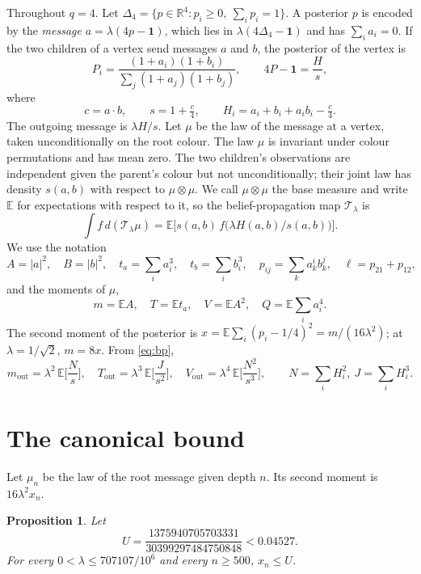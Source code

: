 \documentclass[11pt]{amsart}
\newtheorem{proposition}[theorem]{Proposition}
\theoremstyle{definition}
\theoremstyle{remark}
\newcommand{\E}{\mathbb{E}}
\newcommand{\R}{\mathbb{R}}
\newcommand{\Simp}{\Delta_4}
\newcommand{\one}{\mathbf{1}}
\begin{document}
Throughout $q=4$. Let $\Simp=\{p\in\R^4:p_i\ge0,\ \sum_ip_i=1\}$. A posterior $p$ is encoded by the
\emph{message} $a=\lambda(4p-\one)$, which lies in $\lambda(4\Simp-\one)$ and has $\sum_ia_i=0$. If the
two children of a vertex send messages $a$ and $b$, the posterior of the vertex is
\[
P_i=\frac{(1+a_i)(1+b_i)}{\sum_j(1+a_j)(1+b_j)},
\qquad
4P-\one=\frac{H}{s},
\]
where
\[
c=a\cdot b,\qquad s=1+\tfrac c4,\qquad H_i=a_i+b_i+a_ib_i-\tfrac c4 .
\]
The outgoing message is $\lambda H/s$. Let $\mu$ be the law of the message at a vertex, taken
unconditionally on the root colour. The law $\mu$ is invariant under colour permutations and has mean
zero. The two children's observations are independent given the parent's colour but not
unconditionally; their joint law has density $s(a,b)$ with respect to $\mu\otimes\mu$. We call
$\mu\otimes\mu$ the base measure and write $\E$ for expectations with respect to it, so the
belief-propagation map $\mathcal T_\lambda$ is
\begin{equation}\label{eq:bp}
\int f\,d(\mathcal T_\lambda\mu)=\E\Big[s(a,b)\,f\big(\lambda H(a,b)/s(a,b)\big)\Big].
\end{equation}
We use the notation
\[
A=|a|^2,\quad B=|b|^2,\quad t_a=\textstyle\sum_ia_i^3,\quad t_b=\sum_ib_i^3,\quad
p_{ij}=\sum_k a_k^ib_k^j,\quad \ell=p_{21}+p_{12},
\]
and the moments of $\mu$,
\[
m=\E A,\quad T=\E t_a,\quad V=\E A^2,\quad Q=\E\textstyle\sum_ia_i^4 .
\]
The second moment of the posterior is $x=\E\sum_i(p_i-1/4)^2=m/(16\lambda^2)$; at $\lambda=1/\sqrt2$,
$m=8x$. From \eqref{eq:bp},
\begin{equation}\label{eq:moments-out}
m_{\mathrm{out}}=\lambda^2\,\E\Big[\frac Ns\Big],\quad
T_{\mathrm{out}}=\lambda^3\,\E\Big[\frac J{s^2}\Big],\quad
V_{\mathrm{out}}=\lambda^4\,\E\Big[\frac{N^2}{s^3}\Big],
\qquad N=\textstyle\sum_iH_i^2,\ J=\sum_iH_i^3 .
\end{equation}

\section{The canonical bound}\label{sec:grid}

Let $\mu_n$ be the law of the root message given depth $n$. Its second moment is $16\lambda^2x_n$.

\begin{proposition}\label{prop:grid}
Let
\[
U=\frac{1375940705703331}{30399297484750848}<0.04527 .
\]
For every $0<\lambda\le707107/10^6$ and every $n\ge500$, $x_n\le U$.
\end{proposition}
\end{document}
